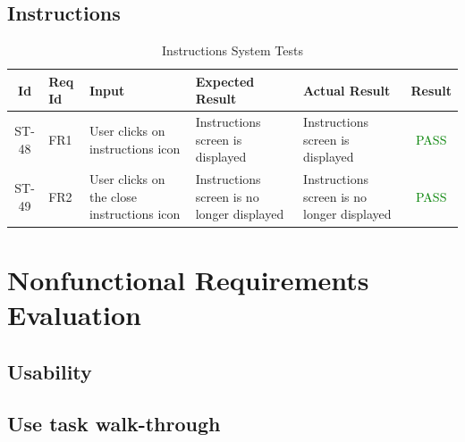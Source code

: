 \documentclass[12pt, titlepage]{article}
\begin{document}
	\subsection{Instructions}
	
	\begin{center}
		\begin{longtable}{|c|p{1cm}|p{2.7cm}|p{3cm}|p{3cm}|c|}
			\caption{Instructions System Tests \label{long}}\\
			\hline
			\textbf{Id} & \textbf{Req Id} & \textbf{Input} & \textbf{Expected Result} & \textbf{Actual Result} & \textbf{Result}   \\
			\hline
			ST-48 & FR1 & User clicks on instructions icon & Instructions screen is displayed & Instructions screen is displayed & \textcolor{green}{PASS} \\
			\hline
			ST-49 & FR2 & User clicks on the close instructions icon & Instructions screen is no longer displayed & Instructions screen is no longer displayed & \textcolor{green}{PASS} \\
			\hline
		\end{longtable}
	\end{center}
	
	\newpage
	
	\section{Nonfunctional Requirements Evaluation}
	
	\subsection{Usability}
	
	\subsection{Use task walk-through}
	
\end{document}
